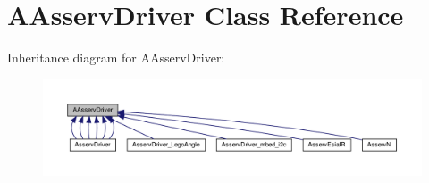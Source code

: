 \hypertarget{classAAsservDriver}{}\section{A\+Asserv\+Driver Class Reference}
\label{classAAsservDriver}


Inheritance diagram for A\+Asserv\+Driver\+:
\nopagebreak
\begin{figure}[H]
\begin{center}
\leavevmode
\includegraphics[width=350pt]{classAAsservDriver__inherit__graph}
\end{center}
\end{figure}
